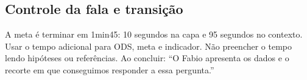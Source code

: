 \subsection{Controle da fala e transição}
A meta é terminar em 1min45: 10 segundos na capa e 95 segundos no contexto. Usar o tempo adicional para ODS, meta e indicador. Não preencher o tempo lendo hipóteses ou referências.
Ao concluir: ``O Fabio apresenta os dados e o recorte em que conseguimos responder a essa pergunta.''
